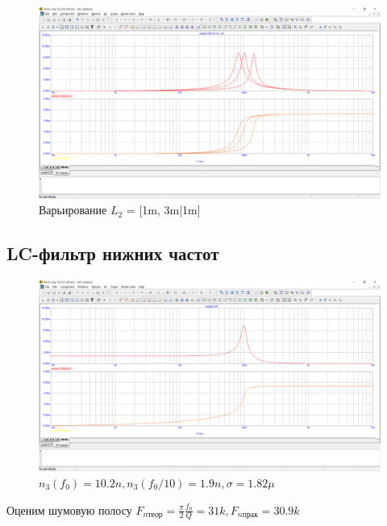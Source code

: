 \documentclass[a4paper, 12pt]{article}%
\begin{document}
\begin{figure}[h!]
    \centering
    \includegraphics[scale = 0.4 \textwidth]{images/mod3_2_5.png}
    \caption{Варьирование $L_2$ = [1m, 3m|1m]}
    \label{fig:m325}
\end{figure}

\subsection{LC-фильтр нижних частот}

\begin{figure}[h!]
    \centering
    \includegraphics[scale = 0.4 \textwidth]{images/mod3_3_1.png}
    \caption{$n_3(f_0) = 10.2n, n_3(f_0/10) = 1.9n, \sigma = 1.82\mu$}
    \label{fig:m331}
\end{figure}

Оценим шумовую полосу $F_{n\text{теор}} = \frac{\pi}{2}\frac{f_0}{Q} = 31k, F_{n\text{прак}} = 30.9k$
\end{document}
